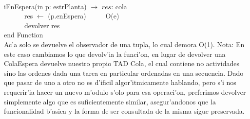 \documentclass[a4paper,10pt]{article}
\begin{document}
\begin{algoritmo}
\caption{}\\
  iEnEspera(in p: estrPlanta) $\rightarrow$ $res$: cola \\
	\indent \ \ \ \ \ \  res $\gets$ (p.enEspera)  \ \ \ \ \ O(e)\\
	\indent \ \ \ \ \ \  devolver res    \\
   end Function  \\

Ac'a solo se devuelve el observador de una tupla, lo cual demora O(1). Nota: En este caso cambiamos lo que devolv'ia la funci'on, en lugar de devolver una ColaEspera devuelve nuestro propio TAD Cola, el cual contiene no actividades sino las ordenes dada una tarea en particular ordenadas en una secuencia. Dado que pasar de uno a otro no es d'ificil algor'itmicamente hablando, pero s'i nos requerir'ia hacer un nuevo m'odulo s'olo para esa operaci'on, preferimos devolver simplemente algo que es suficientemente similar, asegur'andonos que la funcionalidad b'asica y la forma de ser consultada de la misma sigue preservada.

\end{algoritmo}
\newpage
\end{document}
